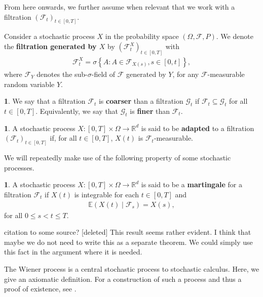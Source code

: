 \documentclass[english]{article}
\newcommand{\comment}[1]{\color{blue}#1\color{black}}
\newcommand{\tomcomment}[1]{\color{orange}#1\color{black}}
\numberwithin{equation}{section}
\numberwithin{figure}{section}
\theoremstyle{bolddescit}
\theoremstyle{definition}
\newtheorem{definition}[theorem]{\protect\definitionname}
\theoremstyle{definition}
\theoremstyle{plain}
\theoremstyle{plain}
\theoremstyle{bolddesc}
\theoremstyle{plain}
\theoremstyle{remark}
\providecommand{\definitionname}{Definition}
\begin{document}
From here onwards, we further assume when relevant that we work with a filtration $(\mathcal{F}_t)_{t \in [0,T]}$.

Consider a stochastic process $X$ in the probability space $(\Omega, \mathcal{F}, P)$. We denote the \textbf{filtration generated by $X$} by $(\mathcal{F}^X_t)_{t \in [0,T]}$ with
\begin{align*}
  \mathcal{F}^X_t = \sigma \left\{ A : A \in \mathcal{F}_{X(s)}, s \in [0,t] \right\},
\end{align*}
where $\mathcal{F}_{Y}$ denotes the sub-$\sigma$-field of $\mathcal{F}$ generated by $Y$, for any $\mathcal{F}$-measurable random variable $Y$.

\begin{definition}
  We say that a filtration $\mathcal{F}_t$ is \textbf{coarser} than a filtration $\mathcal{G}_t$ if $\mathcal{F}_t \subseteq \mathcal{G}_t$ for all $t \in [0,T]$. Equivalently, we say that $\mathcal{G}_t$ is \textbf{finer} than $\mathcal{F}_t$.
\end{definition}

\begin{definition}
  A stochastic process $X : [0,T] \times \Omega \to \mathbb{R}^d$ is said to be \textbf{adapted} to a filtration $(\mathcal{F}_t)_{t \in [0,T]}$ if, for all $t \in [0,T]$, $X(t)$ is $\mathcal{F}_t$-measurable.
\end{definition}

We will repeatedly make use of the following property of some stochastic processes.

\begin{definition}
  A stochastic process $X : [0,T] \times \Omega \to \mathbb{R}^d$ is said to be a \textbf{martingale} for a filtration $\mathcal{F}_t$ if $X(t)$ is integrable for each $t \in [0,T]$ and
  \begin{align*}
    \mathbb{E}(X(t) \mid \mathcal{F}_s) = X(s),
  \end{align*}
  for all $0 \le s < t \le T$.
\end{definition}

\comment{citation to some source?}
\tomcomment{[deleted]}
\comment{This result seems rather evident. I think that maybe we do not need to write this as a separate theorem. We could simply use this fact in the argument where it is needed.}

The Wiener process is a central stochastic process to stochastic calculus. Here, we give an axiomatic definition. For a construction of such a process and thus a proof of existence, see \textcite{capinski_stochastic_2012}.
\end{document}
